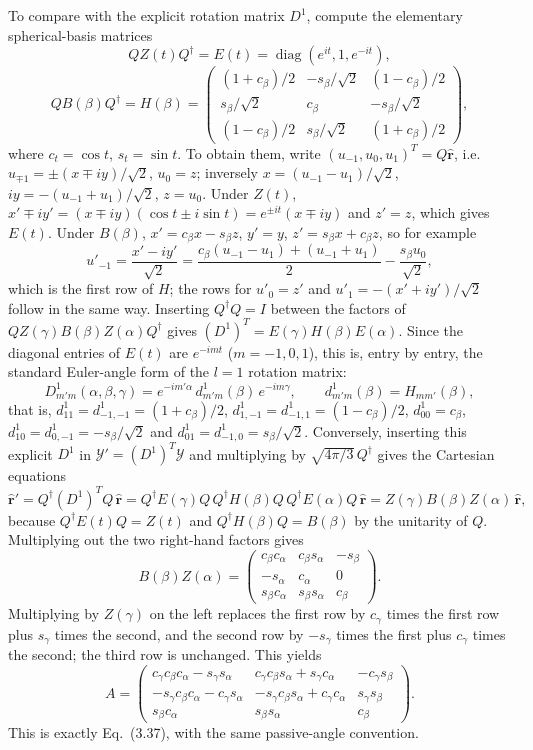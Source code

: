 To compare with the explicit rotation matrix $D^1$, compute the
elementary spherical-basis matrices
\[
QZ(t)Q^\dagger=E(t)=\operatorname{diag}(e^{it},1,e^{-it}),
\]
\[
QB(\beta)Q^\dagger=
H(\beta)=\begin{pmatrix}
(1+c_\beta)/2&-s_\beta/\sqrt2&(1-c_\beta)/2\\
s_\beta/\sqrt2&c_\beta&-s_\beta/\sqrt2\\
(1-c_\beta)/2&s_\beta/\sqrt2&(1+c_\beta)/2
\end{pmatrix},
\]
where $c_t=\cos t$, $s_t=\sin t$.
To obtain them, write $(u_{-1},u_0,u_1)^T=Q\hat{\mathbf r}$, i.e.
$u_{\mp1}=\pm(x\mp iy)/\sqrt2$, $u_0=z$; inversely
$x=(u_{-1}-u_1)/\sqrt2$, $iy=-(u_{-1}+u_1)/\sqrt2$, $z=u_0$.
Under $Z(t)$, $x'\mp iy'=(x\mp iy)(\cos t\pm i\sin t)
=e^{\pm it}(x\mp iy)$ and $z'=z$, which gives $E(t)$.
Under $B(\beta)$, $x'=c_\beta x-s_\beta z$, $y'=y$,
$z'=s_\beta x+c_\beta z$, so for example
\[
u'_{-1}=\frac{x'-iy'}{\sqrt2}
=\frac{c_\beta(u_{-1}-u_1)+(u_{-1}+u_1)}{2}-\frac{s_\beta u_0}{\sqrt2},
\]
which is the first row of $H$; the rows for $u'_0=z'$ and
$u'_1=-(x'+iy')/\sqrt2$ follow in the same way.
Inserting $Q^\dagger Q=I$ between the factors of
$QZ(\gamma)B(\beta)Z(\alpha)Q^\dagger$ gives
$(D^1)^T=E(\gamma)H(\beta)E(\alpha)$.
Since the diagonal entries of $E(t)$ are $e^{-imt}$ ($m=-1,0,1$),
this is, entry by entry, the standard Euler-angle form of the $l=1$
rotation matrix:
\[
D^1_{m'm}(\alpha,\beta,\gamma)
=e^{-im'\alpha}\,d^1_{m'm}(\beta)\,e^{-im\gamma},\qquad
d^1_{m'm}(\beta)=H_{mm'}(\beta),
\]
that is, $d^1_{11}=d^1_{-1,-1}=(1+c_\beta)/2$,
$d^1_{1,-1}=d^1_{-1,1}=(1-c_\beta)/2$, $d^1_{00}=c_\beta$,
$d^1_{10}=d^1_{0,-1}=-s_\beta/\sqrt2$ and
$d^1_{01}=d^1_{-1,0}=s_\beta/\sqrt2$.
Conversely, inserting this explicit $D^1$ in
$\mathcal Y'=(D^1)^T\mathcal Y$ and multiplying by
$\sqrt{4\pi/3}\,Q^\dagger$ gives the Cartesian equations
\[
\hat{\mathbf r}'=Q^\dagger(D^1)^TQ\,\hat{\mathbf r}
=Q^\dagger E(\gamma)Q\,Q^\dagger H(\beta)Q\,Q^\dagger E(\alpha)Q\,
\hat{\mathbf r}
=Z(\gamma)B(\beta)Z(\alpha)\,\hat{\mathbf r},
\]
because $Q^\dagger E(t)Q=Z(t)$ and $Q^\dagger H(\beta)Q=B(\beta)$ by
the unitarity of $Q$.
Multiplying out the two right-hand factors gives
\[
B(\beta)Z(\alpha)=
\begin{pmatrix}
c_\beta c_\alpha&c_\beta s_\alpha&-s_\beta\\
-s_\alpha&c_\alpha&0\\
s_\beta c_\alpha&s_\beta s_\alpha&c_\beta
\end{pmatrix}.
\]
Multiplying by $Z(\gamma)$ on the left replaces the first row by
$c_\gamma$ times the first row plus $s_\gamma$ times the second, and
the second row by $-s_\gamma$ times the first plus $c_\gamma$ times
the second; the third row is unchanged. This yields
\[
\boxed{A=
\begin{pmatrix}
c_\gamma c_\beta c_\alpha-s_\gamma s_\alpha&
c_\gamma c_\beta s_\alpha+s_\gamma c_\alpha&-c_\gamma s_\beta\\
-s_\gamma c_\beta c_\alpha-c_\gamma s_\alpha&
-s_\gamma c_\beta s_\alpha+c_\gamma c_\alpha&s_\gamma s_\beta\\
s_\beta c_\alpha&s_\beta s_\alpha&c_\beta
\end{pmatrix}}.
\]
This is exactly Eq.~(3.37), with the same passive-angle convention.

